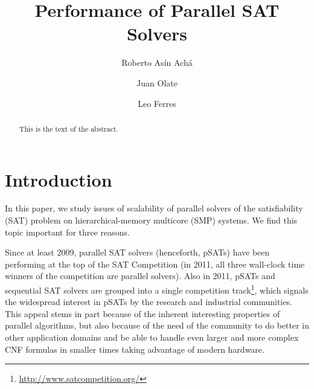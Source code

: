 \documentclass{llncs}
\begin{document}


\newcommand{\assign}{$\,$:=$\;$}
\newcommand{\barc}{Barelogic$^S$}
\newcommand{\pling}{{\tt plingeling}}

\title{Performance of Parallel SAT Solvers}

\author{Roberto As\'in Ach\'a \and Juan Olate  \and Leo Ferres }



\maketitle

\begin{abstract}
This is the text of the abstract.
\end{abstract}

\section{Introduction}

In this paper, we study issues of scalability of parallel solvers of
the satisfiability (SAT) problem on hierarchical-memory multicore
(SMP) systems. We find this topic important for three reasons.

Since at least 2009, parallel SAT solvers (henceforth, pSATs) have
been performing at the top of the SAT Competition (in 2011, all three
wall-clock time winners of the competition are parallel solvers).
Also in 2011, pSATs and sequential SAT solvers are grouped into a
single competition
track\footnote{\url{http://www.satcompetition.org/}}, which signals
the widespread interest in pSATs by the research and industrial
communities. This appeal stems in part because of the inherent
interesting properties of parallel algorithms, but also because of the
need of the community to do better in other application domains and be
able to handle even larger and more complex CNF formulas in smaller
times taking advantage of modern hardware.
\end{document}
